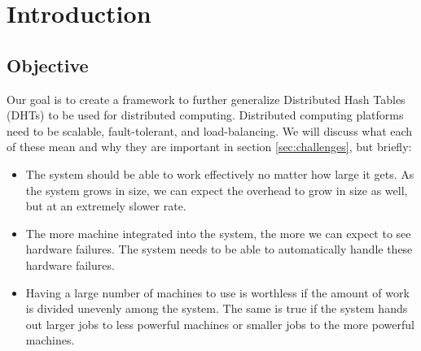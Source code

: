 \chapter{Introduction}
\label{chapter:intro}





\section{Objective}
Our goal is to create a framework to further generalize Distributed Hash Tables (DHTs) to be used for distributed computing.
Distributed computing platforms need to be scalable, fault-tolerant, and load-balancing.
We will discuss what each of these mean and why they are important in section \ref{sec:challenges}, but briefly:

\begin{itemize}
	\item The system should be able to work effectively no matter how large it gets.
	As the system grows in size, we can expect the overhead to grow in size as well, but at an extremely slower rate.
	\item The more machine integrated into the system, the more we can expect to see hardware failures.
	The system needs to be able to automatically handle these hardware failures.
	\item Having a large number of machines to use is worthless if the amount of work is divided unevenly among the system.
	The same is true if the system hands out larger jobs to less powerful machines or smaller jobs to the more powerful machines.
\end{itemize}


